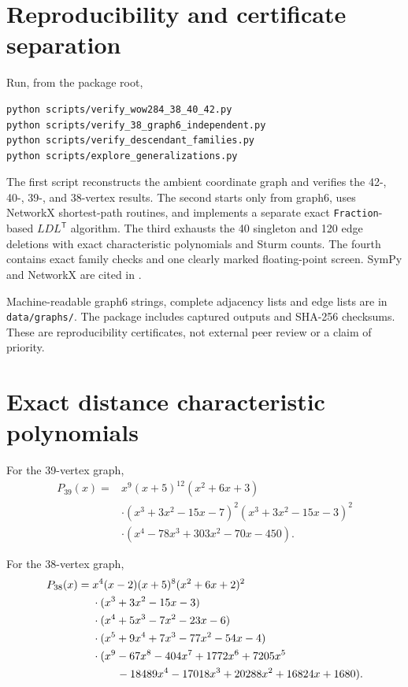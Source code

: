 \documentclass[11pt,reqno]{amsart}
\theoremstyle{plain}
\theoremstyle{definition}
\theoremstyle{remark}
\begin{document}
\section{Reproducibility and certificate separation}

Run, from the package root,
\begin{verbatim}
python scripts/verify_wow284_38_40_42.py
python scripts/verify_38_graph6_independent.py
python scripts/verify_descendant_families.py
python scripts/explore_generalizations.py
\end{verbatim}
The first script reconstructs the ambient coordinate graph and verifies the
42-, 40-, 39-, and 38-vertex results.  The second starts only from graph6,
uses NetworkX shortest-path routines, and implements a separate exact
\texttt{Fraction}-based $LDL^{\mathsf T}$ algorithm.  The third exhausts the
40 singleton and 120 edge deletions with exact characteristic polynomials and
Sturm counts.  The fourth contains exact family checks and one clearly marked
floating-point screen.  SymPy and NetworkX are cited in
\cite{MeurerEtAl2017,HagbergSchultSwart2008}.

Machine-readable graph6 strings, complete adjacency lists and edge lists are
in \texttt{data/graphs/}.  The package includes captured outputs and SHA-256
checksums.  These are reproducibility certificates, not external peer review
or a claim of priority.

\appendix
\section{Exact distance characteristic polynomials}\label{app:polynomials}

For the 39-vertex graph,
\begin{align*}
P_{39}(x)={}&x^9(x+5)^{12}(x^2+6x+3)\\
&\cdot(x^3+3x^2-15x-7)^2(x^3+3x^2-15x-3)^2\\
&\cdot(x^4-78x^3+303x^2-70x-450).
\end{align*}

For the 38-vertex graph,
\begin{align*}
P_{38}(x)={}&x^4(x-2)(x+5)^8(x^2+6x+2)^2\\
&\cdot(x^3+3x^2-15x-3)\\
&\cdot(x^4+5x^3-7x^2-23x-6)\\
&\cdot(x^5+9x^4+7x^3-77x^2-54x-4)\\
&\cdot(x^9-67x^8-404x^7+1772x^6+7205x^5\\
&\hspace{2.2em}-18489x^4-17018x^3+20288x^2+16824x+1680).
\end{align*}



\end{document}

